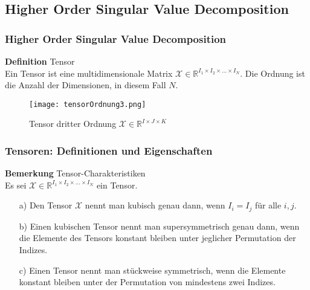 \subsection{Higher Order Singular Value Decomposition}

\begin{frame}
\frametitle{Higher Order Singular Value Decomposition}
\pause



\begin{framed}
\textbf{Definition} Tensor \\
Ein Tensor ist eine multidimensionale Matrix $\pmb{\mathcal{X}}  \in \mathbb{R}^{I_1 \times I_2 \times \dots \times I_N}$.
Die Ordnung ist die Anzahl der Dimensionen, in diesem Fall $N$. 
\end{framed}

\begin{figure}[ht]
	\centering
  \texttt{[image: tensorOrdnung3.png]}
	\caption{Tensor dritter Ordnung $\pmb{\mathcal{X}}  \in \mathbb{R}^{I \times J \times K}$ \cite[456]{Kolda}}
	\label{fig:tensorOrdnung3}
\end{figure}

\end{frame}


\begin{frame}
\frametitle{Tensoren: Definitionen und Eigenschaften}

\begin{framed}
\textbf{Bemerkung} Tensor-Charakteristiken \\
Es sei $\pmb{\mathcal{X}}  \in \mathbb{R}^{I_1 \times I_2 \times \dots \times I_N}$ ein Tensor.
\begin{itemize}
\item[a)] Den Tensor $\pmb{\mathcal{X}}$ nennt man kubisch genau dann, wenn $I_i = I_j$ für alle $i,j$.
\item[b)] Einen kubischen Tensor nennt man supersymmetrisch genau dann, wenn die Elemente des Tensors konstant bleiben unter jeglicher Permutation der Indizes.
\item[c)] Einen Tensor nennt man stückweise symmetrisch, wenn die Elemente konstant bleiben unter der Permutation von mindestens zwei Indizes.
\end{itemize}

\end{framed}

\end{frame}

